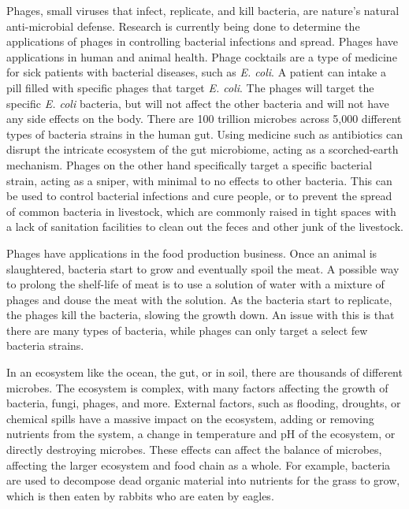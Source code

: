 Phages, small viruses that infect, replicate, and kill bacteria, are nature's natural anti-microbial defense. Research is currently being done to determine the applications of phages in controlling bacterial infections and spread. Phages have applications in human and animal health. Phage cocktails are a type of medicine for sick patients with bacterial diseases, such as \textit{E. coli}. A patient can intake a pill filled with specific phages that target \textit{E. coli}. The phages will target the specific \textit{E. coli} bacteria, but will not affect the other bacteria and will not have any side effects on the body. There are 100 trillion microbes across 5,000 different types of bacteria strains in the human gut. Using medicine such as antibiotics can disrupt the intricate ecosystem of the gut microbiome, acting as a scorched-earth mechanism. Phages on the other hand specifically target a specific bacterial strain, acting as a sniper, with minimal to no effects to other bacteria. This can be used to control bacterial infections and cure people, or to prevent the spread of common bacteria in livestock, which are commonly raised in tight spaces with a lack of sanitation facilities to clean out the feces and other junk of the livestock. 

Phages have applications in the food production business. Once an animal is slaughtered, bacteria start to grow and eventually spoil the meat. A possible way to prolong the shelf-life of meat is to use a solution of water with a mixture of phages and douse the meat with the solution. As the bacteria start to replicate, the phages kill the bacteria, slowing the growth down. An issue with this is that there are many types of bacteria, while phages can only target a select few bacteria strains. 

In an ecosystem like the ocean, the gut, or in soil, there are thousands of different microbes. The ecosystem is complex, with many factors affecting the growth of bacteria, fungi,  phages, and more. External factors, such as flooding, droughts, or chemical spills have a massive impact on the ecosystem, adding or removing nutrients from the system, a change in temperature and pH of the ecosystem, or directly destroying microbes. These effects can affect the balance of microbes, affecting the larger ecosystem and food chain as a whole. For example, bacteria are used to decompose dead organic material into nutrients for the grass to grow, which is then eaten by rabbits who are eaten by eagles. 

